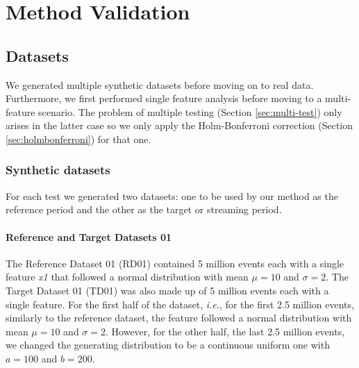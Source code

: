 \chapter{Method Validation} \label{chap:validation} \minitoc

\section{Datasets}



We generated multiple synthetic datasets before moving on to real data. Furthermore, we first performed single feature analysis before moving to a multi-feature scenario. The problem of multiple testing (Section \ref{sec:multi-test}) only arises in the latter case so we only apply the Holm-Bonferroni correction (Section \ref{sec:holmbonferroni}) for that one.

\subsection{Synthetic datasets}
For each test we generated two datasets: one to be used by our method as the reference period and the other as the target or streaming period.

\subsubsection*{Reference and Target Datasets 01}
The Reference Dataset 01 (RD01) contained 5 million events each with a single feature \emph{x1} that followed a normal distribution with mean $\mu=10$ and $\sigma=2$. The Target Dataset 01 (TD01) was also made up of 5 million events each with a single feature. For the first half of the dataset, \textit{i.e.}, for the first 2.5 million events, similarly to the reference dataset, the feature followed a normal distribution with mean $\mu=10$ and $\sigma=2$. However, for the other half, the last 2.5 million events, we changed the generating distribution to be a continuous uniform one with $a=100$ and $b=200$.

